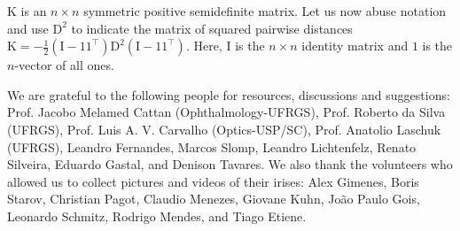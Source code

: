 \documentclass{dnacm} %
\begin{document}
$\mathrm{K}$ is an $n\times n$ symmetric positive semidefinite matrix.
Let us now abuse notation and use $\mathrm{D}^{2}$ to indicate the
matrix of squared pairwise distances $\mathrm{K} =
-\frac{1}{2}(\mathrm{I} -
\mathrm{1}\mathrm{1}^{\top})\mathrm{D}^{2}(\mathrm{I} -
\mathrm{1}\mathrm{1}^{\top})$. Here, $\mathrm{I}$ is the $n \times n$
identity matrix and $\mathrm{1}$ is the $n$-vector of all ones.

\begin{acks}
We are grateful to the following people for resources, discussions and
suggestions: Prof. Jacobo Melamed Cattan (Ophthalmology-UFRGS), Prof.
Roberto da Silva (UFRGS), Prof. Luis A. V. Carvalho (Optics-USP/SC),
Prof. Anatolio Laschuk (UFRGS), Leandro Fernandes, Marcos
Slomp, Leandro Lichtenfelz, Renato Silveira,
Eduardo Gastal, and Denison Tavares. We also thank the volunteers who
allowed us to collect pictures and videos of their irises: Alex Gimenes,
Boris Starov, Christian Pagot, Claudio Menezes, Giovane Kuhn, Jo\~{a}o
Paulo Gois, Leonardo Schmitz, Rodrigo Mendes, and Tiago Etiene.
\end{acks}




\end{document}
